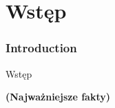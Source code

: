 %
\section{Wstęp}
\begin{frame}[fragile]
	\frametitle{Introduction}

	\begin{center}\huge{Wstęp}\end{center}
	\begin{center}\huge{\color{typo3darkgrey}\textbf{(Najważniejsze fakty)}}\end{center}

\end{frame}


